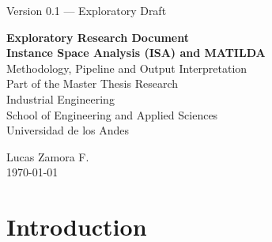\documentclass[12pt]{article}
\begin{document}
\begin{titlepage}
    \thispagestyle{empty}

    \begin{center}

        \vspace*{0cm}
        {\small Version 0.1 --- Exploratory Draft}

        \vspace*{\fill}

        {\Large \textbf{Exploratory Research Document}}\\[0.8cm]

        {\Huge \textbf{Instance Space Analysis (ISA) and MATILDA}}\\[0.4cm]

        {\large Methodology, Pipeline and Output Interpretation}\\[0.6cm]

        {\large Part of the Master Thesis Research}\\[1.2cm]

        {\large Industrial Engineering}\\
        {\large School of Engineering and Applied Sciences}\\
        {\large Universidad de los Andes}

        \vspace*{\fill}

        {\Large Lucas Zamora F.}\\[0.3cm]

        {\large \today}

    \end{center}

\end{titlepage}

\tableofcontents
\newpage

\listoffigures
\newpage

\listoftables
\newpage

\section{Introduction}
\end{document}

